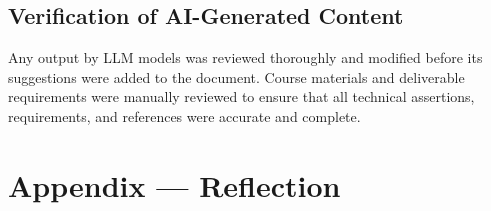 \documentclass[12pt, titlepage]{article}
\begin{document}
\subsection{Verification of AI-Generated Content}


Any output by LLM models was reviewed thoroughly and modified before its
suggestions were added to the document. Course materials and deliverable
requirements were manually reviewed to ensure that all technical assertions,
requirements, and references were accurate and complete.


\newpage{}

\section{Appendix --- Reflection}



% 
\end{document}
